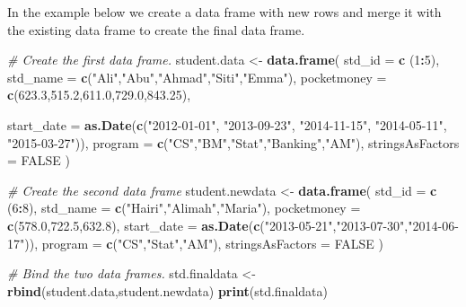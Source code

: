 \documentclass[
]{article}
\newenvironment{Shaded}{\begin{snugshade}}{\end{snugshade}}
\newcommand{\AttributeTok}[1]{\textcolor[rgb]{0.13,0.29,0.53}{#1}}
\newcommand{\CommentTok}[1]{\textcolor[rgb]{0.56,0.35,0.01}{\textit{#1}}}
\newcommand{\ConstantTok}[1]{\textcolor[rgb]{0.56,0.35,0.01}{#1}}
\newcommand{\DecValTok}[1]{\textcolor[rgb]{0.00,0.00,0.81}{#1}}
\newcommand{\FloatTok}[1]{\textcolor[rgb]{0.00,0.00,0.81}{#1}}
\newcommand{\FunctionTok}[1]{\textcolor[rgb]{0.13,0.29,0.53}{\textbf{#1}}}
\newcommand{\NormalTok}[1]{#1}
\newcommand{\OtherTok}[1]{\textcolor[rgb]{0.56,0.35,0.01}{#1}}
\newcommand{\SpecialCharTok}[1]{\textcolor[rgb]{0.81,0.36,0.00}{\textbf{#1}}}
\newcommand{\StringTok}[1]{\textcolor[rgb]{0.31,0.60,0.02}{#1}}
\begin{document}
In the example below we create a data frame with new rows and merge it
with the existing data frame to create the final data frame.

\begin{Shaded}
\begin{Highlighting}[]
\CommentTok{\# Create the first data frame.}
\NormalTok{student.data }\OtherTok{\textless{}{-}} \FunctionTok{data.frame}\NormalTok{(}
   \AttributeTok{std\_id =} \FunctionTok{c}\NormalTok{ (}\DecValTok{1}\SpecialCharTok{:}\DecValTok{5}\NormalTok{), }
   \AttributeTok{std\_name =} \FunctionTok{c}\NormalTok{(}\StringTok{"Ali"}\NormalTok{,}\StringTok{"Abu"}\NormalTok{,}\StringTok{"Ahmad"}\NormalTok{,}\StringTok{"Siti"}\NormalTok{,}\StringTok{"Emma"}\NormalTok{),}
   \AttributeTok{pocketmoney =} \FunctionTok{c}\NormalTok{(}\FloatTok{623.3}\NormalTok{,}\FloatTok{515.2}\NormalTok{,}\FloatTok{611.0}\NormalTok{,}\FloatTok{729.0}\NormalTok{,}\FloatTok{843.25}\NormalTok{), }
   
   \AttributeTok{start\_date =} \FunctionTok{as.Date}\NormalTok{(}\FunctionTok{c}\NormalTok{(}\StringTok{"2012{-}01{-}01"}\NormalTok{, }\StringTok{"2013{-}09{-}23"}\NormalTok{, }\StringTok{"2014{-}11{-}15"}\NormalTok{, }\StringTok{"2014{-}05{-}11"}\NormalTok{,}
      \StringTok{"2015{-}03{-}27"}\NormalTok{)),}
   \AttributeTok{program =} \FunctionTok{c}\NormalTok{(}\StringTok{"CS"}\NormalTok{,}\StringTok{"BM"}\NormalTok{,}\StringTok{"Stat"}\NormalTok{,}\StringTok{"Banking"}\NormalTok{,}\StringTok{"AM"}\NormalTok{),}
   \AttributeTok{stringsAsFactors =} \ConstantTok{FALSE}
\NormalTok{)}

\CommentTok{\# Create the second data frame}
\NormalTok{student.newdata }\OtherTok{\textless{}{-}}  \FunctionTok{data.frame}\NormalTok{(}
   \AttributeTok{std\_id =} \FunctionTok{c}\NormalTok{ (}\DecValTok{6}\SpecialCharTok{:}\DecValTok{8}\NormalTok{), }
   \AttributeTok{std\_name =} \FunctionTok{c}\NormalTok{(}\StringTok{"Hairi"}\NormalTok{,}\StringTok{"Alimah"}\NormalTok{,}\StringTok{"Maria"}\NormalTok{),}
   \AttributeTok{pocketmoney =} \FunctionTok{c}\NormalTok{(}\FloatTok{578.0}\NormalTok{,}\FloatTok{722.5}\NormalTok{,}\FloatTok{632.8}\NormalTok{), }
   \AttributeTok{start\_date =} \FunctionTok{as.Date}\NormalTok{(}\FunctionTok{c}\NormalTok{(}\StringTok{"2013{-}05{-}21"}\NormalTok{,}\StringTok{"2013{-}07{-}30"}\NormalTok{,}\StringTok{"2014{-}06{-}17"}\NormalTok{)),}
   \AttributeTok{program =} \FunctionTok{c}\NormalTok{(}\StringTok{"CS"}\NormalTok{,}\StringTok{"Stat"}\NormalTok{,}\StringTok{"AM"}\NormalTok{),}
   \AttributeTok{stringsAsFactors =} \ConstantTok{FALSE}
\NormalTok{)}

\CommentTok{\# Bind the two data frames.}
\NormalTok{std.finaldata }\OtherTok{\textless{}{-}} \FunctionTok{rbind}\NormalTok{(student.data,student.newdata)}
\FunctionTok{print}\NormalTok{(std.finaldata)}
\end{Highlighting}
\end{Shaded}
\end{document}
